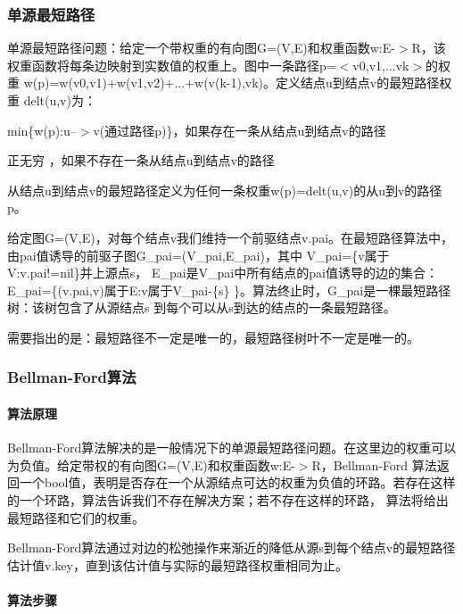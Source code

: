 \subsubsection*{单源最短路径}

单源最短路径问题：给定一个带权重的有向图\+G=(V,E)和权重函数w\+:E-\/$>$R，该权重函数将每条边映射到实数值的权重上。图中一条路径p=$<$v0,v1,...vk$>$的权重 w(p)=w(v0,v1)+w(v1,v2)+...+w(v(k-\/1),vk)。定义结点u到结点v的最短路径权重 delt(u,v)为：


\begin{DoxyItemize}
\item min\{w(p)\+:u--$>$v(通过路径p)\}，如果存在一条从结点u到结点v的路径
\item 正无穷 ，如果不存在一条从结点u到结点v的路径
\end{DoxyItemize}

从结点u到结点v的最短路径定义为任何一条权重w(p)=delt(u,v)的从u到v的路径p。

给定图\+G=(V,E)，对每个结点v我们维持一个前驱结点v.\+pai。在最短路径算法中，由pai值诱导的前驱子图\+G\+\_\+pai=(V\+\_\+pai,E\+\_\+pai)，其中 V\+\_\+pai=\{v属于\+V\+:v.\+pai!=nil\}并上源点s， E\+\_\+pai是\+V\+\_\+pai中所有结点的pai值诱导的边的集合：\+E\+\_\+pai=\{(v.\+pai,v)属于\+E\+:v属于\+V\+\_\+pai-\/\{s\} \}。算法终止时，\+G\+\_\+pai是一棵最短路径树：该树包含了从源结点s 到每个可以从s到达的结点的一条最短路径。

需要指出的是：最短路径不一定是唯一的，最短路径树叶不一定是唯一的。

\subsubsection*{Bellman-\/\+Ford算法}

\paragraph*{算法原理}

Bellman-\/\+Ford算法解决的是一般情况下的单源最短路径问题。在这里边的权重可以为负值。给定带权的有向图\+G=(V,E)和权重函数w\+:E-\/$>$R，\+Bellman-\/\+Ford 算法返回一个bool值，表明是否存在一个从源结点可达的权重为负值的环路。若存在这样的一个环路，算法告诉我们不存在解决方案；若不存在这样的环路， 算法将给出最短路径和它们的权重。

Bellman-\/\+Ford算法通过对边的松弛操作来渐近的降低从源s到每个结点v的最短路径估计值v.key，直到该估计值与实际的最短路径权重相同为止。

\paragraph*{算法步骤}


